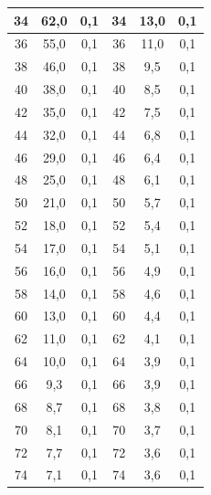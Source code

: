 \documentclass[a4paper, 12pt]{article}%
\begin{document}
\begin{enumerate}
\begin{tabular}{|c|c|c||ccc}
34 & 62,0 & 0,1 & \multicolumn{1}{c|}{34} & \multicolumn{1}{c|}{13,0} & \multicolumn{1}{c|}{0,1} \\ \hline
36 & 55,0 & 0,1 & \multicolumn{1}{c|}{36} & \multicolumn{1}{c|}{11,0} & \multicolumn{1}{c|}{0,1} \\ \hline
38 & 46,0 & 0,1 & \multicolumn{1}{c|}{38} & \multicolumn{1}{c|}{9,5} & \multicolumn{1}{c|}{0,1} \\ \hline
40 & 38,0 & 0,1 & \multicolumn{1}{c|}{40} & \multicolumn{1}{c|}{8,5} & \multicolumn{1}{c|}{0,1} \\ \hline
42 & 35,0 & 0,1 & \multicolumn{1}{c|}{42} & \multicolumn{1}{c|}{7,5} & \multicolumn{1}{c|}{0,1} \\ \hline
44 & 32,0 & 0,1 & \multicolumn{1}{c|}{44} & \multicolumn{1}{c|}{6,8} & \multicolumn{1}{c|}{0,1} \\ \hline
46 & 29,0 & 0,1 & \multicolumn{1}{c|}{46} & \multicolumn{1}{c|}{6,4} & \multicolumn{1}{c|}{0,1} \\ \hline
48 & 25,0 & 0,1 & \multicolumn{1}{c|}{48} & \multicolumn{1}{c|}{6,1} & \multicolumn{1}{c|}{0,1} \\ \hline
50 & 21,0 & 0,1 & \multicolumn{1}{c|}{50} & \multicolumn{1}{c|}{5,7} & \multicolumn{1}{c|}{0,1} \\ \hline
52 & 18,0 & 0,1 & \multicolumn{1}{c|}{52} & \multicolumn{1}{c|}{5,4} & \multicolumn{1}{c|}{0,1} \\ \hline
54 & 17,0 & 0,1 & \multicolumn{1}{c|}{54} & \multicolumn{1}{c|}{5,1} & \multicolumn{1}{c|}{0,1} \\ \hline
56 & 16,0 & 0,1 & \multicolumn{1}{c|}{56} & \multicolumn{1}{c|}{4,9} & \multicolumn{1}{c|}{0,1} \\ \hline
58 & 14,0 & 0,1 & \multicolumn{1}{c|}{58} & \multicolumn{1}{c|}{4,6} & \multicolumn{1}{c|}{0,1} \\ \hline
60 & 13,0 & 0,1 & \multicolumn{1}{c|}{60} & \multicolumn{1}{c|}{4,4} & \multicolumn{1}{c|}{0,1} \\ \hline
62 & 11,0 & 0,1 & \multicolumn{1}{c|}{62} & \multicolumn{1}{c|}{4,1} & \multicolumn{1}{c|}{0,1} \\ \hline
64 & 10,0 & 0,1 & \multicolumn{1}{c|}{64} & \multicolumn{1}{c|}{3,9} & \multicolumn{1}{c|}{0,1} \\ \hline
66 & 9,3 & 0,1 & \multicolumn{1}{c|}{66} & \multicolumn{1}{c|}{3,9} & \multicolumn{1}{c|}{0,1} \\ \hline
68 & 8,7 & 0,1 & \multicolumn{1}{c|}{68} & \multicolumn{1}{c|}{3,8} & \multicolumn{1}{c|}{0,1} \\ \hline
70 & 8,1 & 0,1 & \multicolumn{1}{c|}{70} & \multicolumn{1}{c|}{3,7} & \multicolumn{1}{c|}{0,1} \\ \hline
72 & 7,7 & 0,1 & \multicolumn{1}{c|}{72} & \multicolumn{1}{c|}{3,6} & \multicolumn{1}{c|}{0,1} \\ \hline
74 & 7,1 & 0,1 & \multicolumn{1}{c|}{74} & \multicolumn{1}{c|}{3,6} & \multicolumn{1}{c|}{0,1} \\ \hline
\end{tabular}


\end{enumerate}
\end{document}
